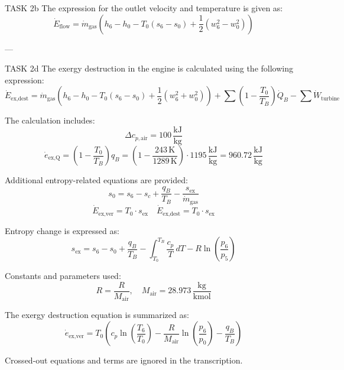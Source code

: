 TASK 2b  
The expression for the outlet velocity and temperature is given as:  
\[
\dot{E}_{\text{flow}} = \dot{m}_{\text{gas}} \left( h_6 - h_0 - T_0 (s_6 - s_0) + \frac{1}{2} (w_6^2 - w_0^2) \right)
\]

---

TASK 2d  
The exergy destruction in the engine is calculated using the following expression:  
\[
\dot{E}_{\text{ex,dest}} = \dot{m}_{\text{gas}} \left( h_6 - h_0 - T_0 (s_6 - s_0) + \frac{1}{2} (w_6^2 + w_0^2) \right) + \sum \left( 1 - \frac{T_0}{T_B} \right) \dot{Q}_B - \sum \dot{W}_\text{turbine}
\]

The calculation includes:  
\[
\Delta c_{p,\text{air}} = 100 \, \frac{\text{kJ}}{\text{kg}}
\]
\[
\dot{e}_{\text{ex,Q}} = \left( 1 - \frac{T_0}{T_B} \right) q_B = \left( 1 - \frac{243 \, \text{K}}{1289 \, \text{K}} \right) \cdot 1195 \, \frac{\text{kJ}}{\text{kg}} = 960.72 \, \frac{\text{kJ}}{\text{kg}}
\]

Additional entropy-related equations are provided:  
\[
s_0 = s_6 - s_c + \frac{q_B}{T_B} - \frac{s_{\text{ex}}}{\dot{m}_{\text{gas}}}
\]
\[
\dot{E}_{\text{ex,ver}} = T_0 \cdot s_{\text{ex}} \quad \dot{E}_{\text{ex,dest}} = T_0 \cdot s_{\text{ex}}
\]

Entropy change is expressed as:  
\[
s_{\text{ex}} = s_6 - s_0 + \frac{q_B}{T_B} - \int_{T_0}^{T_B} \frac{c_p}{T} \, dT - R \ln \left( \frac{p_6}{p_5} \right)
\]

Constants and parameters used:  
\[
R = \frac{R}{M_{\text{air}}}, \quad M_{\text{air}} = 28.973 \, \frac{\text{kg}}{\text{kmol}}
\]

The exergy destruction equation is summarized as:  
\[
\dot{e}_{\text{ex,ver}} = T_0 \left( c_p \ln \left( \frac{T_6}{T_0} \right) - \frac{R}{M_{\text{air}}} \ln \left( \frac{p_6}{p_0} \right) - \frac{q_B}{T_B} \right)
\]  

Crossed-out equations and terms are ignored in the transcription.